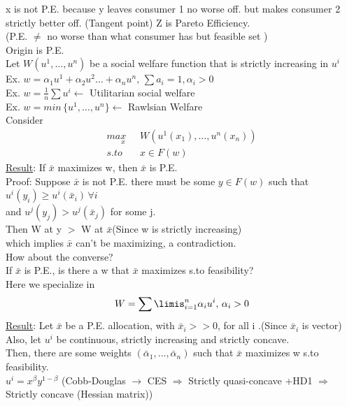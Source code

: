 \documentclass[letterpaper,13pt,single,pdftex]{scrartcl}
\begin{document}
x is not P.E. because y leaves consumer 1 no worse off. but makes consumer 2 strictly better off. 
(Tangent point) Z is Pareto Efficiency. \\
(P.E. $\ne$ no worse than what consumer has but feasible set )\\
Origin is P.E. \\

Let $W(u^1,\dots, u^n)$ be a social welfare function that is strictly increasing in $u^i$\\
Ex. $ w = \alpha_1 u^1 + \alpha_2 u^2\dots +\alpha_n u^n,\, \sum a_i = 1, \alpha_i>0$\\
Ex. $ w = \frac{1}{n}\sum u^i \leftarrow$ Utilitarian social welfare\\
Ex. $ w = min\,\{u^1,\dots, u^n\} \leftarrow$ Rawlsian Welfare\\

Consider 
\begin{align*}
max\limits_x \, &W(u^1(x_1), \dots, u^n(x_n))\\
s.to \quad &x\in F(w)
\end{align*}
\underline{Result}: If $\bar{x}$ maximizes w, then $\bar{x}$ is P.E. \\
Proof: Suppose $\bar{x}$ is not P.E. there must be some $y \in F(w)$ such that \\$u^i(y_i) \ge u^i(\bar{x}_i) \,\forall i$ \\and  $u^j(y_j) > u^j(\bar{x}_j)$ for some j.\\
Then W at y $>$ W at $\bar{x}$(Since w is strictly increasing)\\
which implies $\bar{x}$ can't be maximizing, a contradiction. \\

How about the converse?\\
If $\bar{x}$ is P.E., is there a w that $\bar{x}$ maximizes s.to feasibility?\\
Here we specialize in 
\[W = \sum\limis_{i=1} ^{n} \alpha_i u^i, \, \alpha _i >0\]
\underline{Result}: Let $\bar{x}$ be a P.E. allocation, with $\bar{x}_i >> 0$, for all i .(Since $\bar{x}_i $ is vector) \\
Also, let $u^i$ be continuous, strictly increasing and strictly concave.\\
Then, there are some weights $(\bar{\alpha}_1, \dots, \bar{\alpha}_n) $ such that $\bar{x}$ maximizes w s.to feasibility. \\
$u^i = x^{\beta}y^{1-\beta}$ (Cobb-Douglas $\rightarrow$ CES $\Rightarrow$ Strictly  quasi-concave +HD1 $\Rightarrow$ Strictly concave (Hessian matrix))
\end{document}
